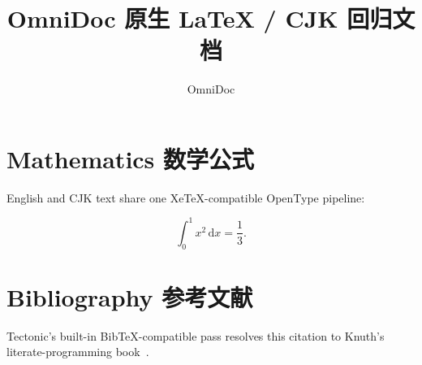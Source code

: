 \documentclass[11pt]{article}
\title{OmniDoc 原生 LaTeX / CJK 回归文档}
\author{OmniDoc}
\date{}
\begin{document}
\maketitle



\section{Mathematics 数学公式}

English and CJK text share one XeTeX-compatible OpenType pipeline:

\[
  \int_0^1 x^2\,\mathrm{d}x = \frac{1}{3}.
\]


\section{Bibliography 参考文献}

Tectonic's built-in BibTeX-compatible pass resolves this citation to
Knuth's literate-programming book~\cite{knuth1984literate}.



\end{document}

